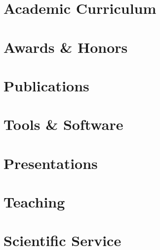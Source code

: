 \documentclass[11pt]{article}
\begin{document}

\section{Academic Curriculum}


\section{Awards \& Honors}
\label{awards}


\section{Publications}
\label{publications}


\clearpage

\section{Tools \& Software}
\label{tools}


\section{Presentations}
\label{presentations}


\section{Teaching}
\label{teaching}


\section{Scientific Service}
\label{service}

\end{document}
